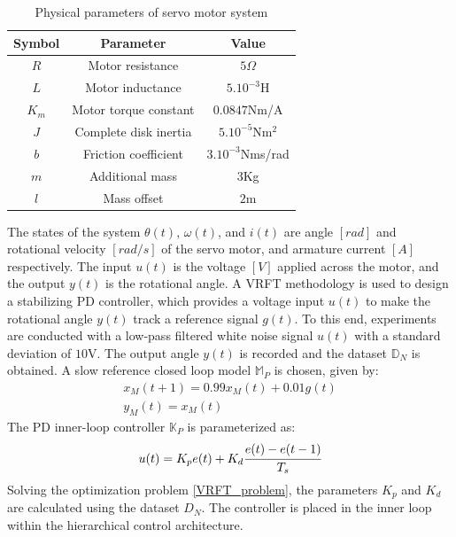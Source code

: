 \documentclass[letterpaper, 10 pt, conference]{ieeeconf}  %
\begin{document}
	\begin{table}[h!]
		\hspace{30pt}
		\begin{tabular}{||c|c|c||} 
			\hline
			Symbol & Parameter & Value\\ [0.5ex] 
			\hline\hline
			$R$ & Motor resistance & $5\Omega$ \\ 
			$L$ & Motor inductance & $5.10^{-3}$H \\
			$K_m$ & Motor torque constant & $0.0847$Nm/A \\
			$J$ & Complete disk inertia & $5.10^{-5}$Nm$^2$ \\
			$b$ & Friction coefficient & $3.10^{-3}$Nms/rad \\
			$m$ & Additional mass & $3$Kg \\
			$l$ & Mass offset & $2$m \\
			\hline
		\end{tabular}
		\caption{Physical parameters of servo motor system}
		\label{Simparam}
	\end{table}
	The states of the system $\theta(t)$, $\omega(t)$, and $i(t)$ are angle $[rad]$ and rotational velocity $[rad/s]$ of the servo motor, and armature current $[A]$ respectively. The input $u(t)$ is the voltage $[V]$ applied across the motor, and the output $y(t)$ is the rotational angle. 
	A VRFT methodology is used to design a stabilizing PD controller, which provides a voltage input $u(t)$ to make the rotational angle $y(t)$ track a reference signal $g(t)$. To this end, experiments are conducted with a low-pass filtered white noise signal $u(t)$ with a standard deviation of $10$V. The output angle $y(t)$ is recorded and the dataset $\mathbb{D}_N$ is obtained. A slow reference closed loop model $\mathbb{M}_P$ is chosen, given by:
	\begin{equation*}
	\begin{matrix}
	x_M(t+1) = 0.99x_M(t) + 0.01g(t)\\
	y_M(t) = x_M(t)
	\end{matrix}
	\end{equation*}
	The PD inner-loop controller $\mathbb{K}_P$ is parameterized as:
	\begin{equation*}
	u(t) = K_pe(t) + K_d\cfrac{e(t)-e(t-1)}{T_s}
	\end{equation*} 
	Solving the optimization problem \eqref{VRFT_problem}, the parameters 
	$K_p$ and $K_d$ are calculated using the dataset $D_N$. The controller is placed in the inner loop within the hierarchical control architecture.
\end{document}
